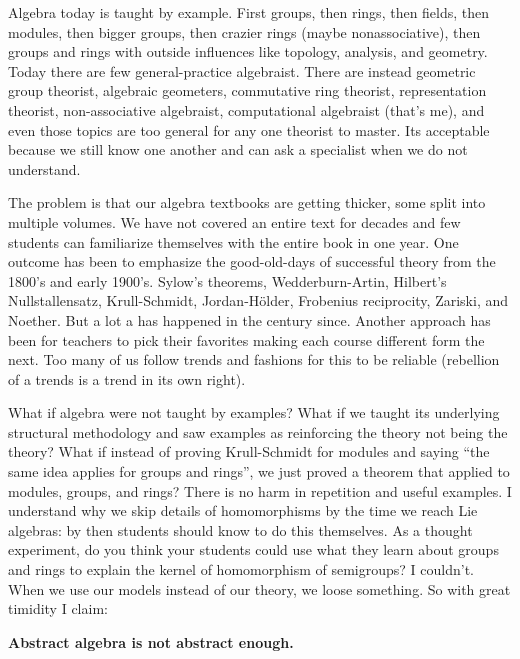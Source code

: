 
Algebra today is taught by example. First groups, then rings,
then fields, then modules, then bigger groups, then crazier rings
(maybe nonassociative), then groups and rings with outside influences like topology, analysis,
and geometry. Today there are few general-practice algebraist.  There are
instead geometric group theorist, algebraic geometers, commutative ring
theorist, representation theorist, non-associative algebraist, computational
algebraist (that's me), and even those topics are too general for any one
theorist to master. Its acceptable because we still know one another and can ask
a specialist when we do not understand. 

The problem is that our algebra textbooks are getting thicker, some split into
multiple volumes. We have not covered an entire text for decades and few  
students can familiarize themselves with the entire book in one year.
One outcome has been to emphasize the good-old-days of successful theory from the
1800's and early 1900's.  Sylow's theorems, Wedderburn-Artin, Hilbert's
Nullstallensatz, Krull-Schmidt, Jordan-H\"older, Frobenius reciprocity,
Zariski, and Noether. But a
lot a has happened in the century since.  Another approach has been for teachers to
pick their favorites making each course different form the next.  
Too many of us follow trends and fashions for this to be reliable (rebellion of 
a trends is a trend in its own right).

What if algebra were not taught by examples?  What if we taught its
underlying structural methodology and saw examples as reinforcing the theory
not being the theory?  What if instead of proving Krull-Schmidt for modules and
saying ``the same idea applies for groups and rings'', we just proved a theorem
that applied to modules, groups, and rings?  There is no harm in repetition and
useful examples.  I understand why we skip details of homomorphisms by the time 
we reach Lie algebras: by then students should know to do this themselves.
As a thought experiment, do you think your students could use what they learn about 
groups and rings to explain the kernel of homomorphism of semigroups?
I couldn't.  When we use our models instead of our theory,
we loose something.  So with great timidity I claim:

\begin{center}
    \textbf{Abstract algebra is not abstract enough.}
\end{center}